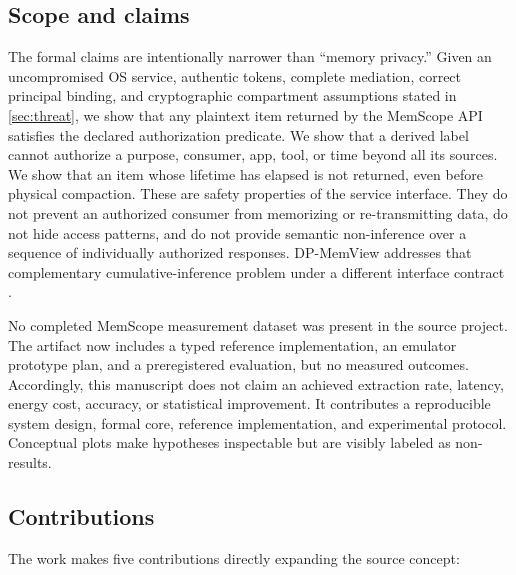 \subsection{Scope and claims}

The formal claims are intentionally narrower than ``memory privacy.'' Given an uncompromised OS service, authentic tokens, complete mediation, correct principal binding, and cryptographic compartment assumptions stated in \cref{sec:threat}, we show that any plaintext item returned by the MemScope API satisfies the declared authorization predicate. We show that a derived label cannot authorize a purpose, consumer, app, tool, or time beyond all its sources. We show that an item whose lifetime has elapsed is not returned, even before physical compaction. These are safety properties of the service interface. They do not prevent an authorized consumer from memorizing or re-transmitting data, do not hide access patterns, and do not provide semantic non-inference over a sequence of individually authorized responses. DP-MemView addresses that complementary cumulative-inference problem under a different interface contract \citep{kim2026dpmemview,dwork2014algorithmic}.

No completed MemScope measurement dataset was present in the source project. The artifact now includes a typed reference implementation, an emulator prototype plan, and a preregistered evaluation, but no measured outcomes. Accordingly, this manuscript does not claim an achieved extraction rate, latency, energy cost, accuracy, or statistical improvement. It contributes a reproducible system design, formal core, reference implementation, and experimental protocol. Conceptual plots make hypotheses inspectable but are visibly labeled as non-results.

\subsection{Contributions}

The work makes five contributions directly expanding the source concept:

